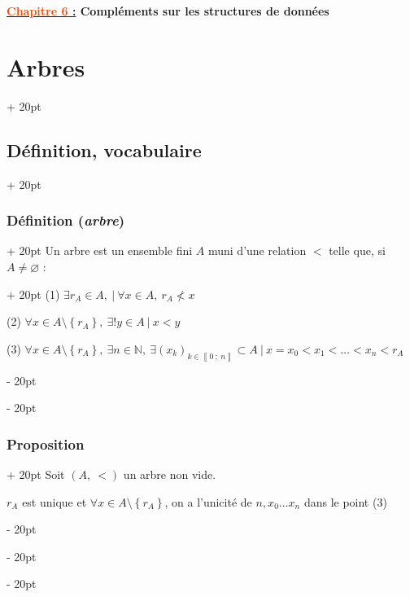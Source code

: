 \documentclass[a4paper, 12pt, twoside]{article}
\renewcommand{\emph}{\textcolor{ff4500}}
\newcommand{\N}{\mathbb{N}} %
\newcommand{\nset}[2]{\left\llbracket #1\ ;\ #2 \right\rrbracket}
\newcommand{\set}[1]{\left\{ #1 \right\}}
\newcommand{\ind}[1][20pt]{\advance\leftskip + #1}
\newcommand{\deind}[1][20pt]{\advance\leftskip - #1}
\newenvironment{indt}[2][20pt]{#2 \par \ind[#1]}{\par \deind} %
\newcommand{\thetitle}[2]{\begin{center}\textbf{{\LARGE \underline{\emph{#1} :}} {\Large #2}}\end{center}}
\begin{document}
    
    \thetitle{Chapitre 6}{Compléments sur les structures de données}
    
    \tableofcontents
    \newpage
    
    
    \begin{indt}{\section{Arbres}}
        
        \begin{indt}{\subsection{Définition, vocabulaire}}
            \begin{indt}{\subsubsection{Définition (\textit{arbre})}}
                \label{1.1.1}
                \begin{indt}{Un arbre est un ensemble fini $A$ muni d'une relation $<$ telle que, si $A \neq \varnothing$ :}
                    (1) $\exists r_A \in A,\ |\ \forall x \in A,\ r_A \not < x$
                    
                    (2) $\forall x \in A \setminus \set{r_A},\ \exists ! y \in A \ |\ x < y$
                    
                    (3) $\forall x \in A \setminus \set{r_A},\ \exists n \in \N,\ \exists (x_k)_{k \in \nset 0 n} \subset A\ |\ x = x_0 < x_1 < \ldots < x_n < r_A$
                \end{indt}
            \end{indt}
            
            \vspace{12pt}
            
            \begin{indt}{\subsubsection{Proposition}}
                Soit $(A, \ <)$ un arbre non vide.
                
                $r_A$ est unique et $\forall x \in A \setminus \set{r_A}$, on a l'unicité de $n, x_0 \ldots x_n$ dans le point (3)
                
                \vspace{12pt}
                

\end{indt}
\end{indt}
\end{indt}
\end{document}
